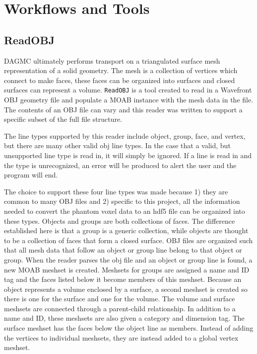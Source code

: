 \clearpage
\section{Workflows and Tools}
\label{sec:workflows}
\subsection{ReadOBJ}
\label{sec:readobj}
DAGMC ultimately performs transport on a triangulated surface mesh representation of a solid geometry.
The mesh is a collection of vertices which connect to make faces, these faces can be organized into 
surfaces and closed surfaces can represent a volume.  \texttt{ReadOBJ} is a tool created to read in a Wavefront OBJ
geometry file and populate a MOAB instance with the mesh data in the file.  The contents of an OBJ file 
can vary \cite{obj} and this reader was written to support a specific subset of the full file structure. 

The line types supported by this reader include object, group, face, and vertex, 
but there are many other valid obj line types.  
In the case that a valid, but unsupported line type is read in, it will simply be ignored.  
If a line is read in and the type is unrecognized, an error will be produced to alert the user
 and the program will end.  

The choice to support these four line types was made because 1) they are common to many OBJ files
and 2) specific to this project, all the information needed to convert the phantom voxel data
to an hdf5 file can be organized into these types.  Objects and groups are both collections
of faces.  The difference established here is that a group is a generic collection, 
while objects are thought to be a collection of faces that form a closed surface.  
OBJ files are organized such that all mesh data that follow an object or group line belong to
that object or group.  When the reader parses the obj file and an object 
or group line is found, a new MOAB meshset is created.  Meshsets for groups are assigned a name 
and ID tag and the faces listed below it become members of this meshset.  Because an object 
represents a volume enclosed by a surface, a second meshset is created so there is one for the surface 
and one for the volume.  The volume and surface meshsets are connected through a parent-child relationship.  
In addition to a name and ID, these meshsets are also given a category and dimension tag.  The surface
meshset has the faces below the object line as members.  Instead of adding the vertices to individual meshsets,
they are instead added to a global vertex meshset.

